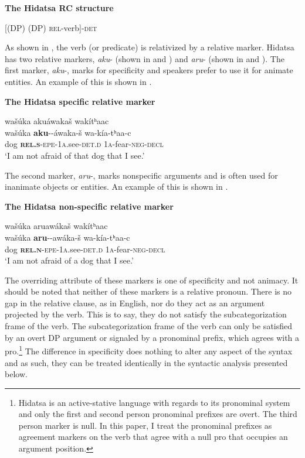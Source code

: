 \documentclass[output=paper]{LSP/langsci}
\begin{document}
\ea \textbf{The Hidatsa RC structure} \label{boyle6}

[(DP) (DP) \textsc{rel}-verb]-\textsc{det}
\z

As shown in , the verb (or predicate) is relativized by a relative marker. Hidatsa has two relative markers, \textit{aku}- (shown in  and ) and \textit{aru}- (shown in  and ). The first marker, \textit{aku}-, marks for specificity and speakers prefer to use it for animate entities. An example of this is shown in .

\ea \textbf{The Hidatsa specific relative marker} \label{boyle7}

\glll wa\v{s}\'uka aku\'awaka\v{s} wak\'itʰaac\\
wa\v{s}\'uka \textbf{aku}--\'awaka-\v{s}  wa-k\'ia-tʰaa-c\\
dog \textbf{\textsc{rel.s}}-\textsc{epe}-\textsc{1a}.see-\textsc{det.d} \textsc{1a}-fear-\textsc{neg-decl}\\
\trans `I am not afraid of that dog that I see.' 
\z

The second marker, \textit{aru}-, marks nonspecific arguments and is often used for inanimate objects or entities. An example of this is shown in .

\ea \textbf{The Hidatsa non-specific relative marker} \label{boyle8}

\glll wa\v{s}\'uka aruaw\'aka\v{s} wak\'itʰaac\\
wa\v{s}\'uka \textbf{aru}--aw\'aka-\v{s}  wa-k\'ia-tʰaa-c\\
dog \textbf{\textsc{rel.n}}-\textsc{epe}-\textsc{1a}.see-\textsc{det.d} \textsc{1a}-fear-\textsc{neg-decl}\\
\trans `I am not afraid of a dog that I see.' 
\z

The overriding attribute of these markers is one of specificity and not animacy. It should be noted that neither of these markers is a relative pronoun. There is no gap in the relative clause, as in English, nor do they act as an argument projected by the verb. This is to say, they do not satisfy the subcategorization frame of the verb.  The subcategorization frame of the verb can only be satisfied by an overt DP argument or signaled by a pronominal prefix, which agrees with a pro.\footnote{Hidatsa is an active-stative language with regards to its pronominal system and only the first and second person pronominal prefixes are overt. The third person marker is null. In this paper, I treat the pronominal prefixes as agreement markers on the verb that agree with a null pro that occupies an argument position.} The difference in specificity does nothing to alter any aspect of the syntax and as such, they can be treated identically in the syntactic analysis presented below.
\end{document}
